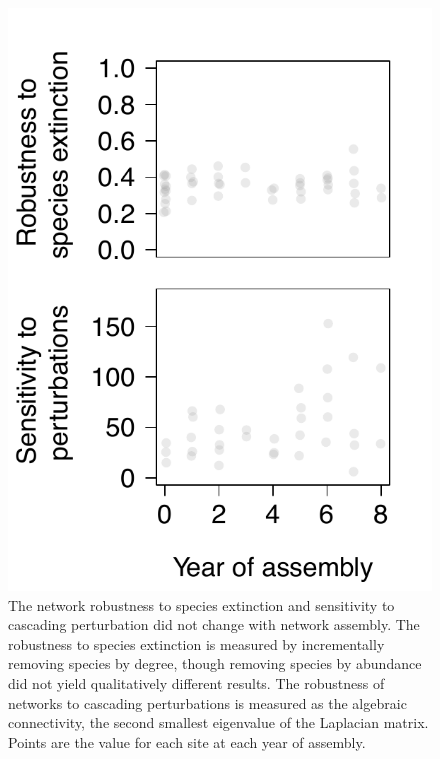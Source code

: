 \documentclass[12pt]{article}
\begin{document}
\begin{figure}
  \centering
  \includegraphics[width=.5\textwidth]{../analysis/networkLevel/figures/robustness.pdf}
  \caption{The network robustness to species extinction and
    sensitivity to cascading perturbation did not change with network
    assembly. The robustness to species extinction is measured by
    incrementally removing species by degree, though removing species
    by abundance did not yield qualitatively different results. The
    robustness of networks to cascading perturbations is measured as
    the algebraic connectivity, the second smallest eigenvalue of the
    Laplacian matrix. Points are the value for each site at each year
    of assembly.}
  \label{fig:rob}
\end{figure}
\clearpage
\end{document}
